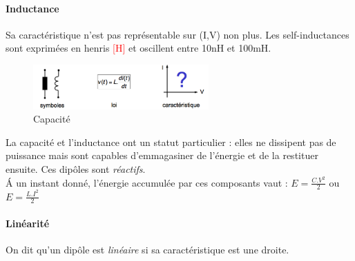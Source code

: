 \documentclass[a4paper]{article}
\begin{document}
    \paragraph{Inductance} Sa caractéristique n'est pas représentable sur (I,V) non plus.
    Les self-inductances sont exprimées en henris \textcolor{red}{[H]} et oscillent
    entre 10nH et 100mH.
    \begin{figure}[H]
        \begin{center}
            \includegraphics[width=0.6\textwidth]{fig/2_inductance.png}
            \caption{Capacité}
        \end{center}
    \end{figure}

    La capacité et l'inductance ont un statut particulier : elles ne dissipent
    pas de puissance mais sont capables d'emmagasiner de l'énergie et de la 
    restituer ensuite. Ces dipôles sont \textit{réactifs}.\\

    \'A un instant donné, l'énergie accumulée par ces composants vaut : 
    $E = \frac{C.V^2}{2}$ ou $E = \frac{L.I^2}{2}$\\

    \paragraph{Linéarité} On dit qu'un dipôle est \textit{linéaire} si sa caractéristique est une droite.
\end{document}
